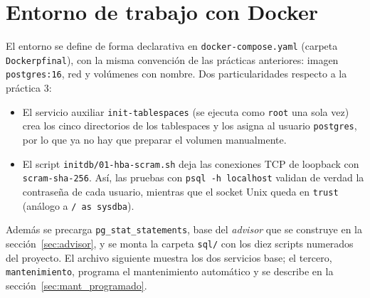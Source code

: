 \documentclass[12pt,a4paper]{article}
\begin{document}
\section{Entorno de trabajo con Docker}

El entorno se define de forma declarativa en \texttt{docker-compose\allowbreak{}.yaml} (carpeta \texttt{Dockerpfinal}), con la misma convención de las prácticas anteriores: imagen \texttt{postgres:16}, red y volúmenes con nombre. Dos particularidades respecto a la práctica 3:

\begin{itemize}
    \item El servicio auxiliar \texttt{init-tablespaces} (se ejecuta como \texttt{root} una sola vez) crea los cinco directorios de los tablespaces y los asigna al usuario \texttt{postgres}, por lo que ya no hay que preparar el volumen manualmente.
    \item El script \texttt{initdb/01-hba-scram.sh} deja las conexiones TCP de loopback con \texttt{scram-sha-256}. Así, las pruebas con \texttt{psql -h localhost} validan de verdad la contraseña de cada usuario, mientras que el socket Unix queda en \texttt{trust} (análogo a \texttt{/ as sysdba}).
\end{itemize}

Además se precarga \texttt{pg\_\allowbreak{}stat\_\allowbreak{}statements}, base del \textit{advisor} que se construye en la sección~\ref{sec:advisor}, y se monta la carpeta \texttt{sql/} con los diez scripts numerados del proyecto. El archivo siguiente muestra los dos servicios base; el tercero, \texttt{mantenimiento}, programa el mantenimiento automático y se describe en la sección~\ref{sec:mant_programado}.
\end{document}
